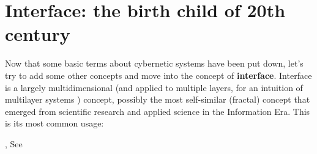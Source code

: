 \documentclass[14pt,a4paper]{extarticle}
\begin{document}
\section*{Interface: the birth child of 20th century}
\label{sec:interface}%

\hspace*{15mm}Now that some basic terms about cybernetic systems have been put down, let’s try to add some other concepts and move into the concept of \textbf{interface}. Interface is a largely multidimensional (and applied to multiple layers, for an intuition of multilayer systems \cite{Shchurov2015,Grassi2021,Thakare2021,Thakare20212}) concept, possibly the most self-similar (fractal) concept that emerged from scientific research and applied science in the Information Era. This is its most common usage:
\begin{center}
\begin{minipage}[t]{0.75\linewidth}
, See \cite{ETYMOinterface}
\end{minipage}
\end{center}
\end{document}

